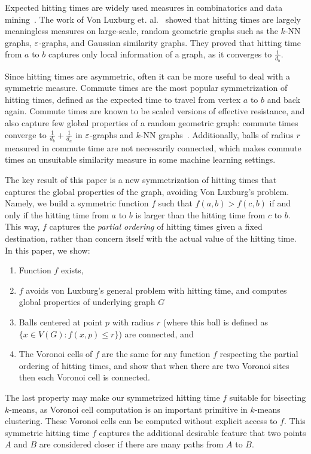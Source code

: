 Expected hitting times are widely used measures in combinatorics and data
mining~\cite{Chen08}. The work of Von Luxburg et.
al.~\cite{VL14} showed that hitting times are largely meaningless
measures on large-scale, random geometric graphs such as the
$k$-NN graphs, $\varepsilon$-graphs, and Gaussian similarity graphs.
They proved that hitting time from $a$ to
$b$ captures only local information of a
graph, as it converges to $\frac{1}{d_b}$.

Since hitting times are asymmetric, often it can be more useful
to deal with a symmetric measure.
Commute times are the most popular symmetrization of hitting
times, defined as the expected time to travel from vertex $a$ to
$b$ and back again. Commute times are known to be scaled
versions of effective resistance, and also capture few global
properties of a random geometric graph: commute times converge to
$\frac{1}{d_b} + \frac{1}{d_a}$ in $\varepsilon$-graphs and $k$-NN
graphs~\cite{VL14}. Additionally, balls of radius $r$ measured in
commute time are not necessarily connected, which makes commute
times an unsuitable similarity measure in some machine learning
settings.

The key result of this paper is a new symmetrization of
hitting times that captures the global properties of the
graph, avoiding Von Luxburg's problem. 
Namely, we build a symmetric
function $f$ such that $f(a,b) > f(c,b)$ if and only if the
hitting time from $a$ to $b$ is larger than the hitting time from
$c$ to $b$. This way, $f$ captures the \textit{partial ordering}
of hitting times given a fixed destination, rather than concern
itself with the actual value of the hitting time. In this paper,
       we show:
\begin{enumerate}
\item Function $f$ exists,
\item $f$ avoids von Luxburg's general problem with hitting
time, and computes global properties of underlying graph $G$
\item Balls centered at point $p$ with radius
$r$
(where this ball is defined as $\{x \in V(G): f(x, p) \leq r\}$) are connected, and
\item  The Voronoi cells of $f$ are the same for any
function $f$ respecting the partial ordering of hitting times,
         and show that when there are two Voronoi sites then each
         Voronoi cell is connected.
\end{enumerate}
The last property may make our symmetrized hitting time $f$
suitable for bisecting $k$-means, as Voronoi cell computation is
an important primitive in $k$-means clustering. These Voronoi cells can be
computed without explicit access to $f$.  
This symmetric hitting time $f$
captures the additional desirable feature that two points $A$ and
$B$ are considered closer if there are many paths from $A$ to
$B$.

